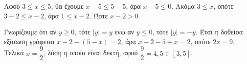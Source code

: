 
\begin{alist}
\item Αφού $3 \le x \le 5$, θα έχουμε $x - 5 \le 5 - 5$, άρα $x - 5 \le 0$. Ακόμα $3 \le x$, οπότε $3 - 2 \le x - 2$, άρα $1 \le x - 2$. Ώστε $x - 2 > 0$.

\item Γνωρίζουμε ότι αν $y \ge 0$, τότε $|y| = y$ ενώ αν $y \le 0$, τότε $|y| = -y$. Έτσι η δοθείσα εξίσωση γράφεται $x - 2 - (5 - x) = 2$, άρα $x - 2 - 5 + x = 2$, οπότε $2x = 9$. Τελικά
$x = \dfrac{9}{2}$, λύση η οποία είναι δεκτή, αφού $\dfrac{9}{2} = 4,5 \in [3, 5]$.
\end{alist}

